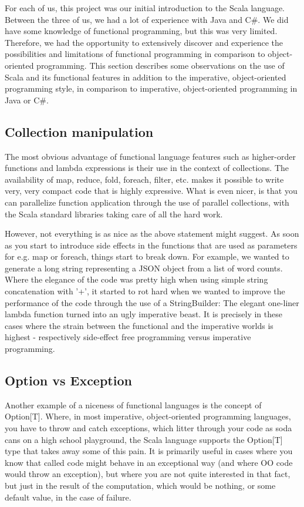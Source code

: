 
For each of us, this project was our initial introduction to the Scala
language. Between the three of us, we had a lot of experience with Java and C\#.
We did have some knowledge of functional programming, but this was very limited.
Therefore, we had the opportunity to extensively discover and experience the
possibilities and limitations of functional programming in comparison to
object-oriented programming. This section describes some observations on the use
of Scala and its functional features in addition to the imperative,
object-oriented programming style, in comparison to imperative, object-oriented
programming in Java or C\#.

\subsection{Collection manipulation}
The most obvious advantage of functional language features such as higher-order
functions and lambda expressions is their use in the context of collections. The
availability of map, reduce, fold, foreach, filter, etc. makes it possible to
write very, very compact code that is highly expressive. What is even nicer, is that
you can parallelize function application through the use of parallel collections,
with the Scala standard libraries taking care of all the hard work.

However, not everything is as nice as the above statement might suggest. As soon
as you start to introduce side effects in the functions that are used as parameters
for e.g. map or foreach, things start to break down. For example, we wanted to
generate a long string representing a JSON object from a list of word counts. Where
the elegance of the code was pretty high when using simple string concatenation with '+',
it started to rot hard when we wanted to improve the performance of the code through
the use of a StringBuilder: The elegant one-liner lambda function turned into an ugly
imperative beast. It is precisely in these cases where the strain between the functional and
the imperative worlds is highest - respectively side-effect free programming versus
imperative programming.

\subsection{Option vs Exception}
Another example of a niceness of functional languages is the concept of Option[T].
Where, in most imperative, object-oriented programming languages, you have to throw
and catch exceptions, which litter through your code as soda cans on a high school playground,
the Scala language supports the Option[T] type that takes away some of this pain.
It is primarily useful in cases where you know that called code might behave in an
exceptional way (and where OO code would throw an exception), but where you are not
quite interested in that fact, but just in the result of the computation, which would
be nothing, or some default value, in the case of failure.


